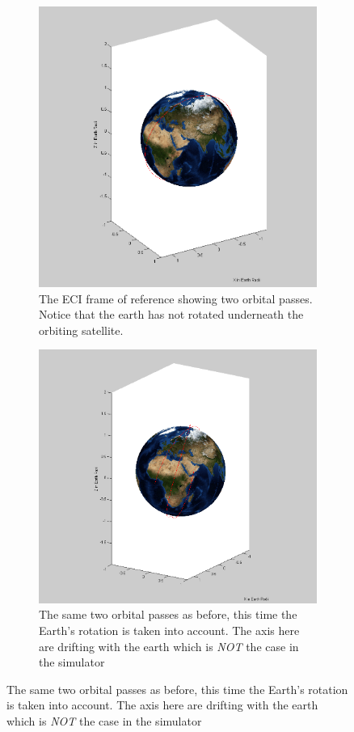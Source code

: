 \documentclass[12pt,a4paper]{article}
\begin{document}
\begin{figure}[h!]
	\centering
	\begin{subfigure}[h!]{0.4\textwidth}
	\includegraphics[scale=0.25]{ECI.png}
	\caption{The ECI frame of reference showing two orbital passes. Notice that the earth has not rotated underneath the orbiting satellite.}
	\end{subfigure}
	\hspace{2cm}
	\begin{subfigure}[h!]{0.4\textwidth}
	\includegraphics[scale=0.25]{ECIMoving.png}
	\caption{The same two orbital passes as before, this time the Earth's rotation is taken into account. The axis here are drifting with the earth which is \emph{NOT} the case in the simulator}
	\end{subfigure}
\end{figure}
\end{document}
